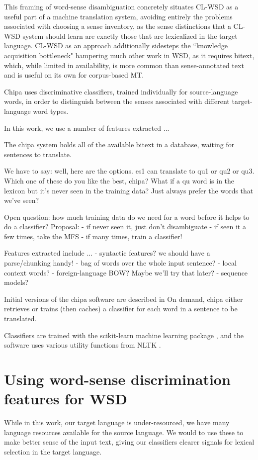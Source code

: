 \documentclass[10pt, a4paper]{article}
\begin{document}
This framing of word-sense disambiguation concretely situates CL-WSD as a
useful part of a machine translation system, avoiding entirely the problems
associated with choosing a sense inventory, as the sense distinctions that a
CL-WSD system should learn are exactly those that are lexicalized in the target
language. CL-WSD as an approach additionally sidesteps the ``knowledge
acquisition bottleneck"
\cite{agirre2006word}
hampering much other work in WSD, as it requires bitext, which, while limited
in availability, is more common than sense-annotated text and is useful on its
own for corpus-based MT.

Chipa uses discriminative classifiers, trained individually for source-language
words, in order to distinguish between the senses associated with different
target-language word types.

In this work, we use a number of features extracted ...

The chipa system holds all of the available bitext in a database, waiting for
sentences to translate.


We have to say: well, here are the options. es1 can translate to qu1 or qu2 or
qu3. Which one of these do you like the best, chipa?
What if a qu word is in the lexicon but it's never seen in the training data?
Just always prefer the words that we've seen?


Open question: how much training data do we need for a word before it helps to
do a classifier?
Proposal:
- if never seen it, just don't disambiguate
- if seen it a few times, take the MFS
- if many times, train a classifier!



Features extracted include ...
- syntactic features? we should have a parse/chunking handy!
- bag of words over the whole input sentence?
- local context words?
- foreign-language BOW? Maybe we'll try that later?
- sequence models?




Initial versions of the chipa software are described in
\cite{rudnick-gasser:2013:HyTra}
On demand, chipa either retrieves or trains (then caches) a classifier
for each word in a sentence to be translated.


Classifiers are trained with the scikit-learn machine learning package
\cite{scikit-learn}, and the software uses various utility functions from NLTK
\cite{nltkbook}.


\section{Using word-sense discrimination features for WSD}
While in this work, our target language is under-resourced, we have many
language resources available for the source language. We would to use these to
make better sense of the input text, giving our classifiers clearer signals for
lexical selection in the target language.
\end{document}
